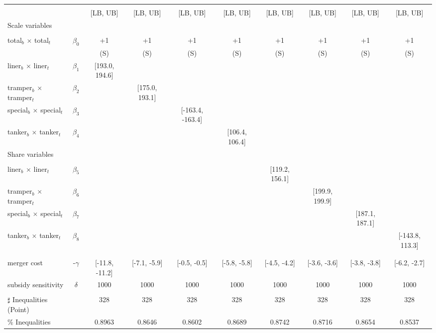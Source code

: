 \begin{tabular}{@{\extracolsep{5pt}}lccccccccc}
\toprule 
 &  &  &  &  &  &  &  &  &  \\
 &  & [LB, UB] & [LB, UB] & [LB, UB] & [LB, UB] & [LB, UB] & [LB, UB] & [LB, UB] & [LB, UB] \\
\midrule 
Scale variables &  &  &  &  &  &  &  \\
 &  &  &  &  &  &  &  &  \\
total$_{b}$ $\times$ total$_{t}$ & $\beta_0$ & +1 & +1 & +1 & +1 & +1 & +1 & +1 & +1 \\
 &  & (S) & (S) & (S) & (S) & (S) & (S) & (S) & (S) \\
liner$_{b}$ $\times$ liner$_{t}$ & $\beta_1$ & [193.0, 194.6] &  &  &  &  &  &  &  \\
tramper$_{b}$ $\times$ tramper$_{t}$ & $\beta_2$ &  & [175.0, 193.1] &  &  &  &  &  &  \\
special$_{b}$ $\times$ special$_{t}$ & $\beta_3$ &  &  & [-163.4, -163.4] &  &  &  &  &  \\
tanker$_{b}$ $\times$ tanker$_{t}$ & $\beta_4$ &  &  &  & [106.4, 106.4] &  &  &  &  \\
Share variables &  &  &  &  &  &  &  &  &  \\
 &  &  &  &  &  &  &  &  &  \\
liner$_{b}$ $\times$ liner$_{t}$ & $\beta_5$ &  &  &  &  & [119.2, 156.1] &  &  &  \\
tramper$_{b}$ $\times$ tramper$_{t}$ & $\beta_6$ &  &  &  &  &  & [199.9, 199.9] &  &  \\
special$_{b}$ $\times$ special$_{t}$ & $\beta_7$ &  &  &  &  &  &  & [187.1, 187.1] &  \\
tanker$_{b}$ $\times$ tanker$_{t}$ & $\beta_8$ &  &  &  &  &  &  &  & [-143.8, 113.3] \\
 &  &  &  &  &  &  &  &  &  \\
 &  &  &  &  &  &  &  &  &  \\
merger cost & -$\gamma$ & [-11.8, -11.2] & [-7.1, -5.9] & [-0.5, -0.5] & [-5.8, -5.8] & [-4.5, -4.2] & [-3.6, -3.6] & [-3.8, -3.8] & [-6.2, -2.7] \\
subsidy sensitivity & $\delta$ & 1000 & 1000 & 1000 & 1000 & 1000 & 1000 & 1000 & 1000 \\
 &  &  &  &  &  &  &  &  &  \\
\hline 
$\sharp$ Inequalities (Point) &  & 328 & 328 & 328 & 328 & 328 & 328 & 328 & 328 \\
\% Inequalities &  & 0.8963 & 0.8646 & 0.8602 & 0.8689 & 0.8742 & 0.8716 & 0.8654 & 0.8537 \\
\bottomrule 
\end{tabular}
